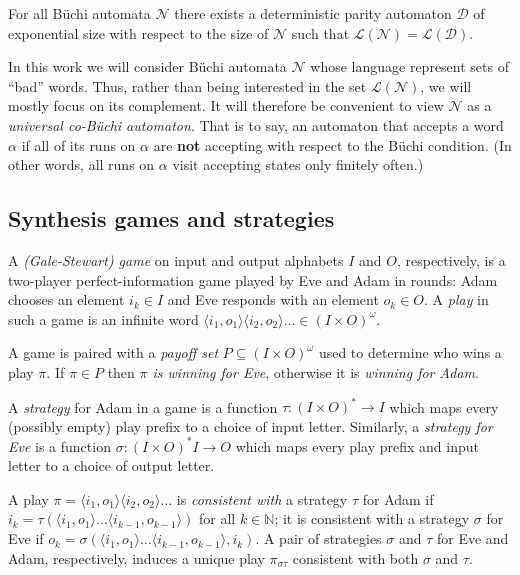 \documentclass[runningheads,a4paper,draft]{llncs}
\newcommand{\eve}{Eve\xspace}
\newcommand{\adam}{Adam\xspace}
\newcommand{\calN}{\mathcal{N}}
\newcommand{\calD}{\mathcal{D}}
\newcommand{\lang}[1]{\mathcal{L}({#1})}
\newcommand{\out}[2]{\pi_{#1#2}}
\begin{document}
\begin{proposition}
  For all B\"uchi automata $\calN$ there exists a deterministic parity
  automaton $\calD$ of exponential size with respect to the size of $\calN$
  such that $\lang{\calN} = \lang{\calD}$.
\end{proposition}

In this work we will consider B\"uchi automata $\calN$ whose
language represent sets of ``bad'' words. Thus, rather than being interested in
the set $\lang{\calN}$, we will mostly focus on its complement. It will
therefore be convenient to view $\calN$ as a \emph{universal
co-B\"uchi automaton}. That is to say, an automaton that accepts a word $\alpha$
if all of its runs on $\alpha$ are \textbf{not} accepting with respect to the
B\"uchi condition. (In other words, all runs on $\alpha$ visit accepting states
only finitely often.)

\subsection{Synthesis games and strategies}
\begin{definition}[Games]
  A \emph{(Gale-Stewart) game} on input and output alphabets $I$ and $O$,
  respectively, is a two-player perfect-information game played by \eve and
  \adam in rounds: \adam chooses an element $i_k \in I$ and \eve responds with
  an element $o_k \in O$. A \emph{play} in such a game is an infinite word
  $\langle i_1, o_1\rangle \langle i_2, o_2\rangle \dots \in (I\times O)^\omega$. 
\end{definition}
A game is paired with a \emph{payoff set} $P \subseteq (I \times
O)^\omega$ used to determine who wins a play $\pi$. If $\pi \in P$ then
\emph{$\pi$ is winning for \eve}, otherwise it is \emph{winning for \adam}.

\begin{definition}[Strategies]
  A \emph{strategy} for \adam in a game is a function $\tau : (I \times O)^*
  \to I$ which maps every (possibly empty) play prefix
  to a choice of input letter.  Similarly, a \emph{strategy for \eve}
  is a function $\sigma : (I \times O)^* I \to O$ which maps every play prefix
  and input letter to a choice of output letter.
\end{definition}
A play $\pi = \langle i_1, o_1\rangle \langle i_2, o_2\rangle \dots$ is
\emph{consistent with} a strategy $\tau$ for \adam if $i_k = \tau( \langle
i_1, o_1\rangle \dots \langle i_{k-1}, o_{k-1}\rangle)$ for all $k \in
\mathbb{N}$; it is consistent with a strategy $\sigma$ for \eve if $o_k =
\sigma( \langle i_1, o_1\rangle \dots \langle i_{k-1}, o_{k-1}\rangle,
i_{k})$.  A pair of strategies $\sigma$ and $\tau$ for \eve and \adam,
respectively, induces a unique play $\out{\sigma}{\tau}$ consistent with both
$\sigma$ and $\tau$.
\end{document}
